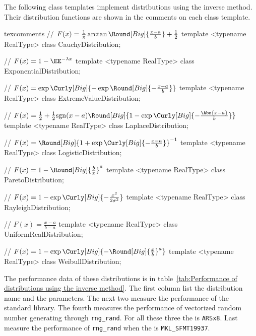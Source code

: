 The following class templates implement distributions using the inverse method.
Their distribution functions are shown in the comments on each class template.
\begin{cppcode*}{texcomments}
  // $F(x) = \frac{1}{\pi}\arctan\Round[Big]{\frac{x - a}{b}} + \frac{1}{2}$
  template <typename RealType>
  class CauchyDistribution;

  // $F(x) = 1 - \EE^{-\lambda x}$
  template <typename RealType>
  class ExponentialDistribution;

  // $F(x) = \exp\Curly[Big]{-\exp\Round[Big]{-\frac{x - a}{b}}}$
  template <typename RealType>
  class ExtremeValueDistribution;

  // $F(x) = \frac{1}{2} + \frac{1}{2}\mathrm{sgn}(x - a)\Round[Big]{1 - \exp\Curly[Big]{-\frac{\Abs{x - a}}{b}}}$
  template <typename RealType>
  class LaplaceDistribution;

  // $F(x) = \Round[Big]{1 + \exp\Curly[Big]{-\frac{x - a}{b}}}^{-1}$
  template <typename RealType>
  class LogisticDistribution;

  // $F(x) = 1 - \Round[Big]{\frac{b}{x}}^a$
  template <typename RealType>
  class ParetoDistribution;

  // $F(x) = 1 - \exp\Curly[Big]{-\frac{x^2}{2\sigma^2}}$
  template <typename RealType>
  class RayleighDistribution;

  // $F(x) = \frac{x - a}{b - a}$
  template <typename RealType>
  class UniformRealDistribution;

  // $F(x) = 1 - \exp\Curly[Big]{-\Round[Big]{\frac{x}{b}}^a}$
  template <typename RealType>
  class WeibullDistribution;
\end{cppcode*}
The performance data of these distributions is in table~\ref{tab:Performance of
  distributions using the inverse method}. The first column list the
distribution name and the parameters. The next two measure the performance of
the standard library. The fourth measures the performance of vectorized random
number generating through \verb|rng_rand|. For all these three the \rng is
\verb|ARSx8|. Last measure the performance of \verb|rng_rand| when the \rng is
\verb|MKL_SFMT19937|.


